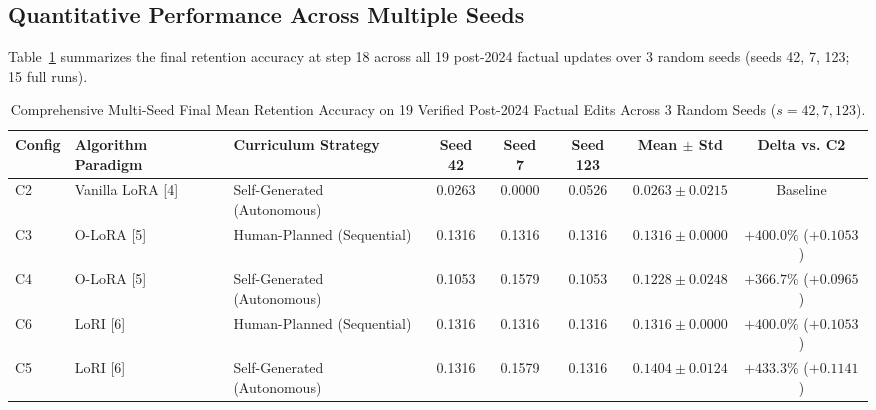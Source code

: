 \documentclass[10pt,journal,compsoc]{IEEEtran}
\begin{document}
\subsection{Quantitative Performance Across Multiple Seeds}
Table~\ref{tab:results} summarizes the final retention accuracy at step 18 across all 19 post-2024 factual updates over 3 random seeds (seeds 42, 7, 123; 15 full runs).

\begin{table}[t]
\centering
\caption{Comprehensive Multi-Seed Final Mean Retention Accuracy on 19 Verified Post-2024 Factual Edits Across 3 Random Seeds ($s=42, 7, 123$).}
\label{tab:results}
\begin{tabular}{lllccccc}
\toprule
\textbf{Config} & \textbf{Algorithm Paradigm} & \textbf{Curriculum Strategy} & \textbf{Seed 42} & \textbf{Seed 7} & \textbf{Seed 123} & \textbf{Mean $\pm$ Std} & \textbf{Delta vs. C2} \\
\midrule
C2 & Vanilla LoRA [4] & Self-Generated (Autonomous) & 0.0263 & 0.0000 & 0.0526 & $0.0263 \pm 0.0215$ & Baseline \\
C3 & O-LoRA [5] & Human-Planned (Sequential) & 0.1316 & 0.1316 & 0.1316 & $0.1316 \pm 0.0000$ & $+400.0\%$ ($+0.1053$) \\
C4 & O-LoRA [5] & Self-Generated (Autonomous) & 0.1053 & 0.1579 & 0.1053 & $0.1228 \pm 0.0248$ & $+366.7\%$ ($+0.0965$) \\
C6 & LoRI [6] & Human-Planned (Sequential) & 0.1316 & 0.1316 & 0.1316 & $0.1316 \pm 0.0000$ & $+400.0\%$ ($+0.1053$) \\
C5 & LoRI [6] & Self-Generated (Autonomous) & 0.1316 & 0.1579 & 0.1316 & $\mathbf{0.1404 \pm 0.0124}$ & $\mathbf{+433.3\%}$ ($\mathbf{+0.1141}$) \\
\bottomrule
\end{tabular}
\end{table}
\end{document}
